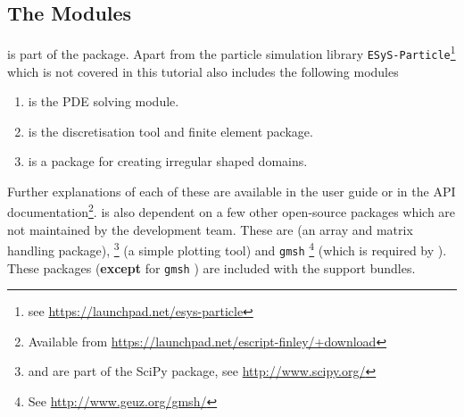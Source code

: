 \subsection{The \modesys Modules}
\esc is part of the \esys package. 
Apart from the particle simulation library
\verb|ESyS-Particle|\footnote{see \url{https://launchpad.net/esys-particle}} which is not covered
in this tutorial \esys also includes the following modules
\begin{enumerate}
\item \modescript is the PDE solving module.
\item \modfinley is the discretisation tool and finite element package.
\item \modpycad  is a package for creating irregular shaped domains.
\end{enumerate}
Further explanations of each of these are available in the \esc user guide or in the API documentation\footnote{Available from \url{https://launchpad.net/escript-finley/+download}}. 
\esc is also dependent on a few other open-source packages which are not maintained by the \esc development team. These are \modnumpy (an array and matrix handling package), \modmpl \footnote{\modnumpy and \modmpl are part of the SciPy package,  see \url{http://www.scipy.org/}} (a simple plotting tool) and \verb|gmsh| \footnote{See \url{http://www.geuz.org/gmsh/}} (which is required by \modpycad). These packages (\textbf{except} for \verb|gmsh| ) are included with the support bundles. 

